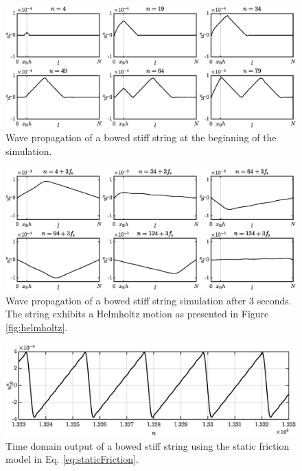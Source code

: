 \begin{figure}[h]
    \centering
    \includegraphics[width=\textwidth]{figures/exciters/bowImplementation.eps}
    \caption{Wave propagation of a bowed stiff string at the beginning of the simulation. \label{fig:staticBowImplementation}}
\end{figure}
\begin{figure}[h]
    \centering
    \includegraphics[width=\textwidth]{figures/exciters/helmholtzState.eps}
    \caption{Wave propagation of a bowed stiff string simulation after 3 seconds. The string exhibits a Helmholtz motion as presented in Figure \ref{fig:helmholtz}. \label{fig:helmholtzState}}
\end{figure}
\begin{figure}[h]
    \centering
    \includegraphics[width=\textwidth]{figures/exciters/helmholtzImplementation.eps}
    \caption{Time domain output of a bowed stiff string using the static friction model in Eq. \eqref{eq:staticFriction}. \label{fig:helmholtzImplementation}}
\end{figure}

